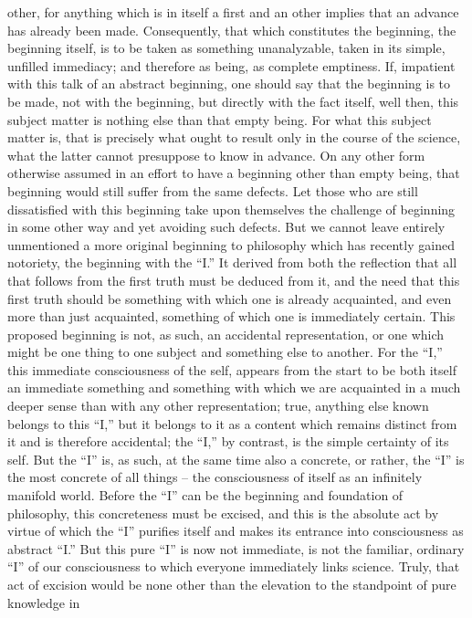 other, for anything which is in itself a first and an other implies that an
advance has already been made. Consequently, that which constitutes the
beginning, the beginning itself, is to be taken as something unanalyzable,
taken in its simple, unfilled immediacy; and therefore as being, as complete
emptiness.
If, impatient with this talk of an abstract beginning, one should say that
the beginning is to be made, not with the beginning, but directly with the
fact itself, well then, this subject matter is nothing else than that empty
being. For what this subject matter is, that is precisely what ought to result
only in the course of the science, what the latter cannot presuppose to
know in advance.
On any other form otherwise assumed in an effort to have a beginning
other than empty being, that beginning would still suffer from the same
defects. Let those who are still dissatisfied with this beginning take upon
themselves the challenge of beginning in some other way and yet avoiding
such defects.
But we cannot leave entirely unmentioned a more original beginning
to philosophy which has recently gained notoriety, the beginning with the
“I.” It derived from both the reflection that all that follows from the first
truth must be deduced from it, and the need that this first truth should be
something with which one is already acquainted, and even more than just
acquainted, something of which one is immediately certain. This proposed
beginning is not, as such, an accidental representation, or one which might
be one thing to one subject and something else to another. For the “I,” this
immediate consciousness of the self, appears from the start to be both itself
an immediate something and something with which we are acquainted in a
much deeper sense than with any other representation; true, anything else
known belongs to this “I,” but it belongs to it as a content which remains
distinct from it and is therefore accidental; the “I,” by contrast, is the simple
certainty of its self. But the “I” is, as such, at the same time also a concrete,
or rather, the “I” is the most concrete of all things – the consciousness of
itself as an infinitely manifold world. Before the “I” can be the beginning
and foundation of philosophy, this concreteness must be excised, and this
is the absolute act by virtue of which the “I” purifies itself and makes its
entrance into consciousness as abstract “I.” But this pure “I” is now not
immediate, is not the familiar, ordinary “I” of our consciousness to which
everyone immediately links science. Truly, that act of excision would be
none other than the elevation to the standpoint of pure knowledge in
